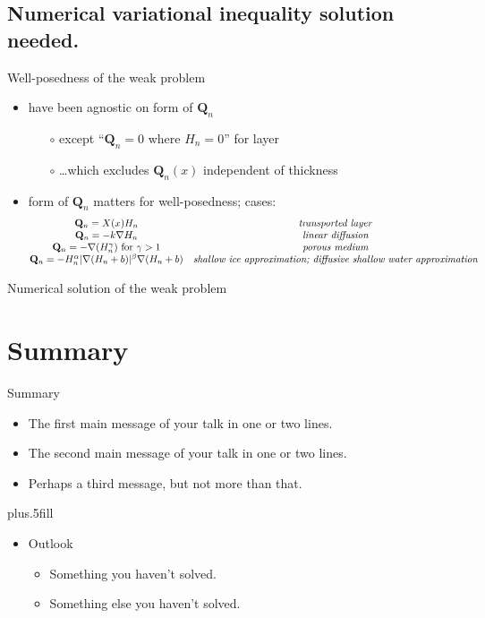 \documentclass{beamer}
\newcommand\bQ{\mathbf{Q}}
\newcommand{\grad}{\nabla}
\begin{document}
\subsection{Numerical variational inequality solution needed.}

\begin{frame}{Well-posedness of the weak problem}
\begin{itemize}
\item have been agnostic on form of $\bQ_n$
  \begin{itemize}
  \item[$\circ$] except ``$\bQ_n=0$ where $H_n=0$'' for layer
  \item[$\circ$] \dots which excludes $\bQ_n(x)$ independent of thickness
  \end{itemize}
\item<2> form of $\bQ_n$ matters for well-posedness; cases:
$$\begin{matrix}
  \bQ_n = X(x) H_n & \text{\emph{transported layer}} \\
  \bQ_n = -k \grad H_n & \text{\emph{linear diffusion}} \\
  \bQ_n = - \grad(H_n^\gamma) \text{ for } \gamma > 1 & \text{\emph{porous medium}} \\
  \bQ_n = - H_n^\alpha |\grad (H_n+b)|^\beta \grad (H_n+b) & \text{\emph{shallow ice approximation; diffusive shallow water approximation}}
\end{matrix}$$
\end{itemize}
\end{frame}

\begin{frame}{Numerical solution of the weak problem}
\end{frame}


\section*{Summary}

\begin{frame}{Summary}

  \begin{itemize}
  \item
    The \alert{first main message} of your talk in one or two lines.
  \item
    The \alert{second main message} of your talk in one or two lines.
  \item
    Perhaps a \alert{third message}, but not more than that.
  \end{itemize}
  
  \vskip0pt plus.5fill
  \begin{itemize}
  \item
    Outlook
    \begin{itemize}
    \item
      Something you haven't solved.
    \item
      Something else you haven't solved.
    \end{itemize}
  \end{itemize}
\end{frame}
\end{document}
